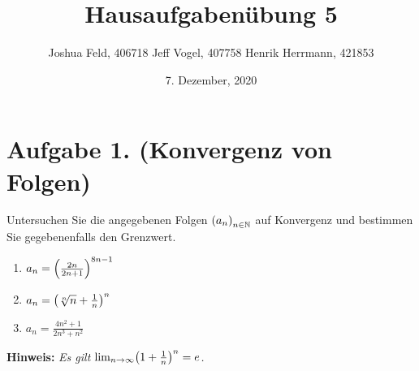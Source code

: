 \documentclass[german,12pt]{homework}
\title{Hausaufgabenübung 5}
\author{Joshua Feld, 406718 \quad Jeff Vogel, 407758 \quad Henrik Herrmann, 421853}
\date{7. Dezember, 2020}
\institute{RWTH Aachen University\\Center for Computational Engineering Science}
\newcommand{\NN}{\mathbb{N}}
\DeclarePairedDelimiter{\enbrace}{(}{)}
\begin{document}
    \maketitle

    \section*{Aufgabe 1. (Konvergenz von Folgen)}

    \begin{problem}
        Untersuchen Sie die angegebenen Folgen \(\enbrace*{a_n}_{n \in \NN}\)
        auf Konvergenz und bestimmen Sie gegebenenfalls den Grenzwert.
        \begin{enumerate}
            \item \(a_n = \enbrace*{\frac{2n}{2n + 1}}^{8n - 1}\)
            \item \(a_n = \enbrace*{\sqrt[n]{n} + \frac{1}{n}}^n\)
            \item \(a_n = \frac{4n^2 + 1}{2n^3 + n^2}\)
        \end{enumerate}
        \textbf{Hinweis:} \quad \emph{Es gilt \(\lim_{n \to \infty}\enbrace*{1
        + \frac{1}{n}}^n = e\).}
    \end{problem}
\end{document}

